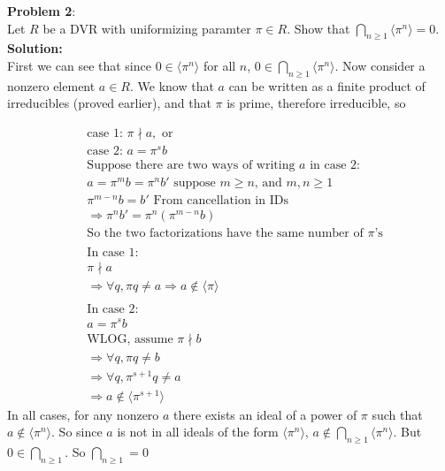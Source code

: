\documentclass[11pt]{article}
\newcommand{\prob}[3]{\begin{flushleft}
        \textbf{Problem #1}: \\
        #2 
		\textbf{Solution:} 
		#3

\end{flushleft}}
\begin{document}
\prob{2}{
  Let $R$ be a DVR with uniformizing paramter $\pi \in R$. Show that $\bigcap_{n \geq 1} \langle \pi^n \rangle = 0$. \\
}{ \\
  First we can see that since $0 \in \langle \pi ^n \rangle$ for all $n$, $0 \in \bigcap_{n \geq 1} \langle \pi ^ n \rangle$.
  \newline
  Now consider a nonzero element $a \in R$. We know that $a$ can be written as a finite product of irreducibles (proved earlier), and that $\pi$ is prime, therefore irreducible, so
  
\begin{align*}
&\text{case 1: } \pi \nmid a, \text{ or}\\
&\text{case 2: } a = \pi ^s b\\
&\text{Suppose there are two ways of writing $a$ in case 2:}\\
&a = \pi ^ m b = \pi ^ n b' \text{ suppose $m \geq n$, and $m, n \geq 1$}\\
&\pi ^ {m-n}b = b' \text{ From cancellation in IDs}\\
&\Rightarrow \pi ^ n b' = \pi^n(\pi ^{m-n} b)\\
&\text{So the two factorizations have the same number of $\pi$'s} \\
&\\
&\text{In case 1:}\\
&\pi \nmid a \\
&\Rightarrow \forall q, \pi q \neq a \Rightarrow a \notin \langle \pi \rangle\\
&\\
&\text{In case 2:}\\
&a = \pi ^ s b\\
&\text{WLOG, assume $\pi \nmid b$}\\
&\Rightarrow \forall q, \pi q \neq b\\
&\Rightarrow \forall q, \pi^{s+1} q \neq a\\
&\Rightarrow a \notin \langle \pi ^ {s+1} \rangle
\end{align*}
In all cases, for any nonzero $a$ there exists an ideal of a power of $\pi$ such that $a \notin \langle \pi ^ n \rangle$. So since $a$ is not in all ideals of the form $\langle \pi ^ n \rangle $, $a \notin \bigcap _{n \geq 1} \langle \pi ^n \rangle$. But $0 \in \bigcap _{n \geq 1}$. So $\bigcap _{n \geq 1} = 0$
}
\end{document}
